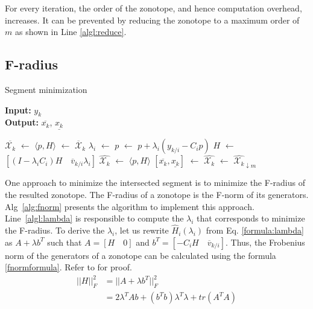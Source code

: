 For every iteration, the order of the zonotope, and hence computation overhead, increases. It can be prevented by reducing the zonotope to a maximum order of $m$ as shown in Line \ref{algl:reduce}.

\subsection{F-radius}
\begin{algorithm}[H]
        \caption{Segment minimization}
        \textbf{Input:} $y_k$\\
 		\textbf{Output:} $\overline{x_k}$, $\underline{x_k}$
        \begin{algorithmic}[1]
        \State $\overline{\mathcal{X}_k}$ $\gets$ 
        \State $\langle p,H \rangle$ $\gets$ $\mathcal{\overline{X}}_k$
        	\State $\lambda_i$ $\gets$  \label{algl:lambda}
        	\State $p$ $\gets$ $p + \lambda_i (y_{k/i} - C_i p)$ \label{algl:center}
        	\State $H$ $\gets$ $[(I- \lambda_i C_i)H \quad \overline{v}_{k/i}\lambda_i]$  \label{algl:g}
        \EndFor
        \State $\hat{\mathcal{X}_k}$ $\gets$ $\langle p, H \rangle$
        \State $[\overline{x_k}, \underline{x_k}]$ $\gets$ 
        \State $\hat{\mathcal{X}_k}$ $\gets$ $\hat{\mathcal{X}_k}_{\downarrow m}$
        \end{algorithmic}
        \label{alg:fnorm}
\end{algorithm}
One approach to minimize the intersected segment is to minimize the F-radius of the resulted zonotope. The F-radius of a zonotope is the F-norm of its generators. Alg~\ref{alg:fnorm} presents the algorithm to implement this approach.\\
Line~\ref{algl:lambda} is responsible to compute the $\lambda_i$ that corresponds to minimize the F-radius. To derive the $\lambda_i$, let us rewrite $\hat{H}_i(\lambda_i)$ from Eq. \ref{formula:lambda} as $A + \lambda b^T$ such that $A= [H \quad 0]$ and $b^T = [-C_i H \quad \overline{v}_{k/i}]$. Thus, the Frobenius norm of the generators of a zonotope can be calculated using the formula \eqref{fnormformula}. Refer to \cite{Alamo2005} for proof.
\begin{equation}
\label{fnormformula}
\begin{split}
||H||_{F}^2 & = ||A + \lambda b^T||^{2}_F \\
&= 2\lambda^T A b+ (b^Tb)\lambda^T\lambda + tr(A^TA)
\end{split}
\end{equation}

